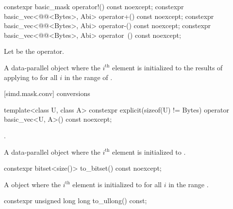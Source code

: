 \begin{itemdecl}
constexpr basic_mask operator!() const noexcept;
constexpr basic_vec<@@<Bytes>, Abi> operator+() const noexcept;
constexpr basic_vec<@@<Bytes>, Abi> operator-() const noexcept;
constexpr basic_vec<@@<Bytes>, Abi> operator~() const noexcept;
\end{itemdecl}

\begin{itemdescr}
\pnum
Let  be the operator.

\pnum
\returns
A data-parallel object where the $i^\text{th}$ element is initialized to the
results of applying  to  for all $i$ in
the range of .
\end{itemdescr}

[simd.mask.conv]{ conversions}

\begin{itemdecl}
template<class U, class A>
  constexpr explicit(sizeof(U) != Bytes) operator basic_vec<U, A>() const noexcept;
\end{itemdecl}

\begin{itemdescr}
\pnum
\constraints
{}.

\pnum
\returns
A data-parallel object where the $i^\text{th}$ element is initialized to
.
\end{itemdescr}

\begin{itemdecl}
constexpr bitset<size()> to_bitset() const noexcept;
\end{itemdecl}

\begin{itemdescr}
\pnum
\returns
A  object where the $i^\text{th}$ element is initialized to
 for all $i$ in the range .
\end{itemdescr}

\begin{itemdecl}
constexpr unsigned long long to_ullong() const;
\end{itemdecl}


